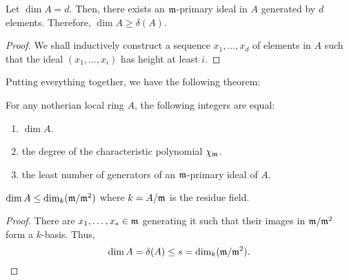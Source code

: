 \begin{proposition}
    Let $\dim A = d$. Then, there exists an $\mathfrak m$-primary ideal in $A$ generated by $d$ elements. Therefore, $\dim A\ge\delta(A)$.
\end{proposition}
\begin{proof}
    We shall inductively construct a sequence $x_1,\dots,x_d$ of elements in $A$ such that the ideal $(x_1,\dots,x_i)$ has height at least $i$.
\end{proof}

Putting everything together, we have the following theorem:

\begin{theorem}
    For any notherian local ring $A$, the following integers are equal: 
    \begin{enumerate}[label=(\alph*)]
        \item $\dim A$. 
        \item the degree of the characteristic polynomial $\chi_\mathfrak m$.
        \item the least number of generators of an $\mathfrak m$-primary ideal of $A$.
    \end{enumerate}
\end{theorem}

\begin{corollary}
    $\dim A\le\dim_k(\mathfrak m/\mathfrak m^2)$ where $k = A/\mathfrak m$ is the residue field.
\end{corollary}
\begin{proof}
    There are $x_1,\dots,x_s\in\mathfrak m$ generating it such that their images in $\mathfrak m/\mathfrak m^2$ form a $k$-basis. Thus, 
    \begin{equation*}
        \dim A = \delta(A)\le s = \dim_k(\mathfrak m/\mathfrak m^2).\qedhere
    \end{equation*}
\end{proof}


